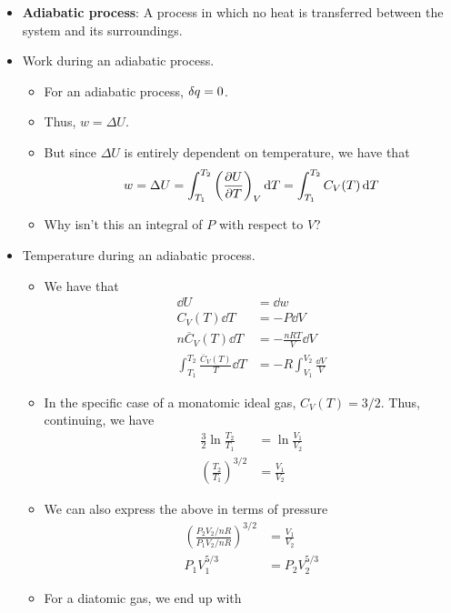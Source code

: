 \documentclass[../notes.tex]{subfiles}
\begin{document}
\begin{itemize}
    \item \textbf{Adiabatic process}: A process in which no heat is transferred between the system and its surroundings.
    \item Work during an adiabatic process.
    \begin{itemize}
        \item For an adiabatic process, $\var{q}=0$.
        \item Thus, $w=\Delta U$.
        \item But since $\Delta U$ is entirely dependent on temperature, we have that
        \begin{equation*}
            w = \Delta U
            = \int_{T_1}^{T_2}\left( \pdv{U}{T} \right)_V\dd{T}
            = \int_{T_1}^{T_2}C_V(T)\dd{T}
        \end{equation*}
        \item Why isn't this an integral of $P$ with respect to $V$?
    \end{itemize}
    \item Temperature during an adiabatic process.
    \begin{itemize}
        \item We have that
        \begin{align*}
            \dd{U} &= \dd{w}\\
            C_V(T)\dd{T} &= -P\dd{V}\\
            n\overline{C}_V(T)\dd{T} &= -\frac{nRT}{V}\dd{V}\\
            \int_{T_1}^{T_2}\frac{\overline{C}_V(T)}{T}\dd{T} &= -R\int_{V_1}^{V_2}\frac{\dd{V}}{V}
        \end{align*}
        \item In the specific case of a monatomic ideal gas, $C_V(T)=3/2$. Thus, continuing, we have
        \begin{align*}
            \frac{3}{2}\ln\frac{T_2}{T_1} &= \ln\frac{V_1}{V_2}\\
            \left( \frac{T_2}{T_1} \right)^{3/2} &= \frac{V_1}{V_2}
        \end{align*}
        \item We can also express the above in terms of pressure
        \begin{align*}
            \left( \frac{P_2V_2/nR}{P_1V_2/nR} \right)^{3/2} &= \frac{V_1}{V_2}\\
            P_1V_1^{5/3} &= P_2V_2^{5/3}
        \end{align*}
        \item For a diatomic gas, we end up with

\end{itemize}
\end{itemize}
\end{document}
